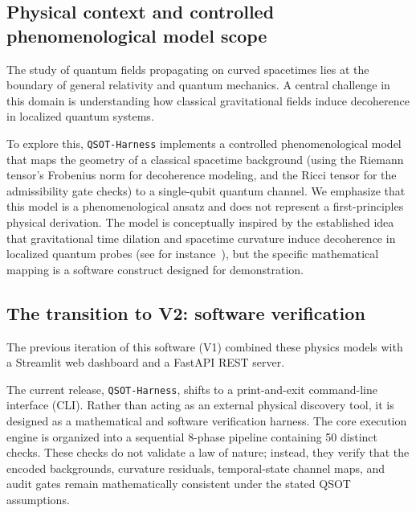 
\subsection{Physical context and controlled phenomenological model scope}
The study of quantum fields propagating on curved spacetimes lies at the boundary of general relativity and quantum mechanics. A central challenge in this domain is understanding how classical gravitational fields induce decoherence in localized quantum systems. 

To explore this, \texttt{QSOT-Harness} implements a controlled phenomenological model that maps the geometry of a classical spacetime background (using the Riemann tensor's Frobenius norm for decoherence modeling, and the Ricci tensor for the admissibility gate checks) to a single-qubit quantum channel. We emphasize that this model is a phenomenological ansatz and does not represent a first-principles physical derivation. The model is conceptually inspired by the established idea that gravitational time dilation and spacetime curvature induce decoherence in localized quantum probes (see for instance~\cite{Pikovski2015}), but the specific mathematical mapping is a software construct designed for demonstration.

\subsection{The transition to V2: software verification}
The previous iteration of this software (V1) combined these physics models with a Streamlit web dashboard and a FastAPI REST server. 

The current release, \texttt{QSOT-Harness}, shifts to a print-and-exit command-line interface (CLI). Rather than acting as an external physical discovery tool, it is designed as a mathematical and software verification harness. The core execution engine is organized into a sequential 8-phase pipeline containing 50 distinct checks. These checks do not validate a law of nature; instead, they verify that the encoded backgrounds, curvature residuals, temporal-state channel maps, and audit gates remain mathematically consistent under the stated QSOT assumptions.

